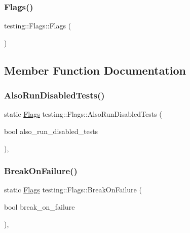 \subsubsection{\texorpdfstring{Flags()}{Flags()}}
{\footnotesize\ttfamily testing\+::\+Flags\+::\+Flags (\begin{DoxyParamCaption}{ }\end{DoxyParamCaption})\hspace{0.3cm}{\ttfamily [inline]}}



\subsection{Member Function Documentation}
\mbox{\label{structtesting_1_1Flags_a8bee2b5f94d8248b6791d6b005db146f}} 
\subsubsection{\texorpdfstring{AlsoRunDisabledTests()}{AlsoRunDisabledTests()}}
{\footnotesize\ttfamily static \mbox{\hyperlink{structtesting_1_1Flags}{Flags}} testing\+::\+Flags\+::\+Also\+Run\+Disabled\+Tests (\begin{DoxyParamCaption}\item[{bool}]{also\+\_\+run\+\_\+disabled\+\_\+tests }\end{DoxyParamCaption})\hspace{0.3cm}{\ttfamily [inline]}, {\ttfamily [static]}}

\mbox{\label{structtesting_1_1Flags_a62660e44922321f7640bc951a04c2296}} 
\subsubsection{\texorpdfstring{BreakOnFailure()}{BreakOnFailure()}}
{\footnotesize\ttfamily static \mbox{\hyperlink{structtesting_1_1Flags}{Flags}} testing\+::\+Flags\+::\+Break\+On\+Failure (\begin{DoxyParamCaption}\item[{bool}]{break\+\_\+on\+\_\+failure }\end{DoxyParamCaption})\hspace{0.3cm}{\ttfamily [inline]}, {\ttfamily [static]}}

